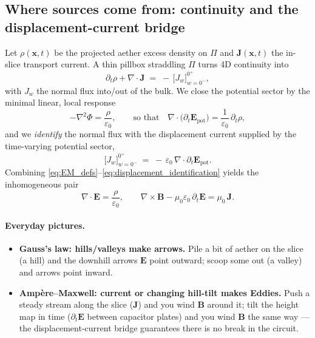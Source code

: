 \subsection{Where sources come from: continuity and the displacement-current bridge}
Let $\rho(\mathbf x,t)$ be the projected aether excess density on $\Pi$ and $\mathbf J(\mathbf x,t)$ the in-slice transport current. A thin pillbox straddling $\Pi$ turns 4D continuity into
\begin{equation}
\partial_t \rho + \nabla\!\cdot\!\mathbf J \;=\; -\,\Big[J_w\Big]_{w=0^-}^{0^+},
\label{eq:slice_continuity}
\end{equation}
with $J_w$ the normal flux into/out of the bulk. We close the potential sector by the minimal linear, local response
\begin{equation}
-\nabla^2 \Phi = \frac{\rho}{\varepsilon_0},
\qquad
\text{so that}\quad
\nabla\!\cdot\!\big(\partial_t\mathbf E_{\text{pot}}\big)=\frac{1}{\varepsilon_0}\,\partial_t\rho,
\label{eq:closure}
\end{equation}
and we \emph{identify} the normal flux with the displacement current supplied by the time-varying potential sector,
\begin{equation}
\Big[J_w\Big]_{w=0^-}^{0^+} \;=\; -\,\varepsilon_0\,\nabla\!\cdot\!\partial_t\mathbf E_{\text{pot}}.
\label{eq:displacement_identification}
\end{equation}
Combining \eqref{eq:EM_defs}–\eqref{eq:displacement_identification} yields the inhomogeneous pair
\begin{equation}
\nabla\!\cdot\!\mathbf E = \frac{\rho}{\varepsilon_0},
\qquad
\nabla\times \mathbf B - \mu_0 \varepsilon_0\,\partial_t \mathbf E = \mu_0\,\mathbf J.
\label{eq:inhomogeneous}
\end{equation}

\paragraph{Everyday pictures.}
\begin{itemize}
  \item \textbf{Gauss's law: hills/valleys make arrows.} Pile a bit of aether on the slice (a hill) and the downhill arrows $\mathbf E$ point outward; scoop some out (a valley) and arrows point inward.
  \item \textbf{Amp\`ere–Maxwell: current or changing hill-tilt makes Eddies.} Push a steady stream along the slice ($\mathbf J$) and you wind $\mathbf B$ around it; tilt the height map in time ($\partial_t\mathbf E$ between capacitor plates) and you wind $\mathbf B$ the same way --- the displacement-current bridge guarantees there is no break in the circuit.
\end{itemize}

